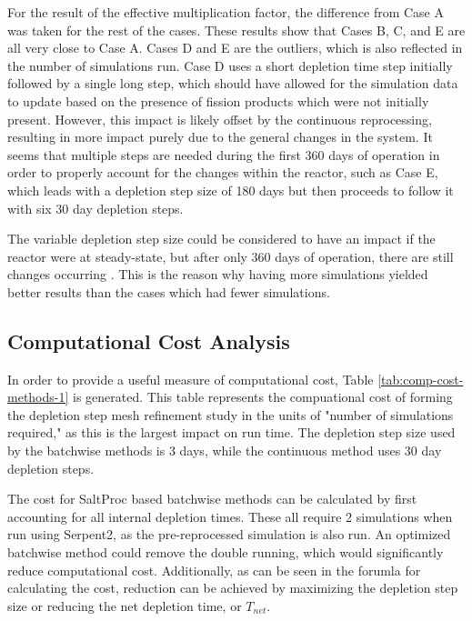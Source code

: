 For the result of the effective multiplication factor, the difference from Case A was taken for the rest of the cases. These results show that Cases B, C, and E are all very close to Case A. Cases D and E are the outliers, which is also reflected in the number of simulations run. Case D uses a short depletion time step initially followed by a single long step, which should have allowed for the simulation data to update based on the presence of fission products which were not initially present.
However, this impact is likely offset by the continuous reprocessing, resulting in more impact purely due to the general changes in the system. It seems that multiple steps are needed during the first 360 days of operation in order to properly account for the changes within the reactor, such as Case E, which leads with a depletion step size of 180 days but then proceeds to follow it with six 30 day depletion steps.

The variable depletion step size could be considered to have an impact if the reactor were at steady-state, but after only 360 days of operation, there are still changes occurring \cite{rykhlevskii_advanced_2018}. This is the reason why having more simulations yielded better results than the cases which had fewer simulations.

\subsection{Computational Cost Analysis}

In order to provide a useful measure of computational cost, Table \ref{tab:comp-cost-methods-1} is generated. This table represents the compuational cost of forming the depletion step mesh refinement study in the units of "number of simulations required," as this is the largest impact on run time. The depletion step size used by the batchwise methods is 3 days, while the continuous method uses 30 day depletion steps.

The cost for SaltProc based batchwise methods can be calculated by first accounting for all internal depletion times. These all require 2 simulations when run using Serpent2, as the pre-reprocessed simulation is also run. An optimized batchwise method could remove the double running, which would significantly reduce computational cost. Additionally, as can be seen in the forumla for calculating the cost, reduction can be achieved by maximizing the depletion step size or reducing the net depletion time, or $T_{net}$.

